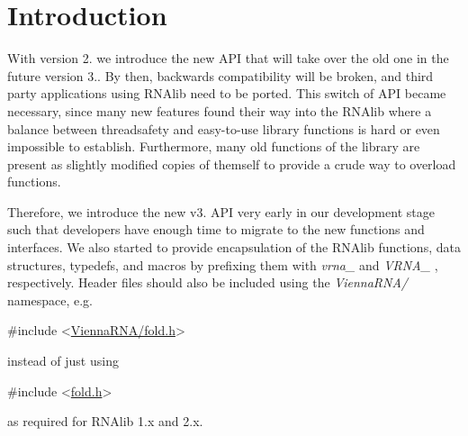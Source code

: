\hypertarget{newAPI_newAPI_intro}{}\section{Introduction}\label{newAPI_newAPI_intro}
With version 2. we introduce the new A\-P\-I that will take over the old one in the future version 3.. By then, backwards compatibility will be broken, and third party applications using R\-N\-Alib need to be ported. This switch of A\-P\-I became necessary, since many new features found their way into the R\-N\-Alib where a balance between threadsafety and easy-\/to-\/use library functions is hard or even impossible to establish. Furthermore, many old functions of the library are present as slightly modified copies of themself to provide a crude way to overload functions.

Therefore, we introduce the new v3. A\-P\-I very early in our development stage such that developers have enough time to migrate to the new functions and interfaces. We also started to provide encapsulation of the R\-N\-Alib functions, data structures, typedefs, and macros by prefixing them with {\itshape vrna\-\_\-} and {\itshape V\-R\-N\-A\-\_\-} , respectively. Header files should also be included using the {\itshape Vienna\-R\-N\-A/} namespace, e.\-g. 
\begin{DoxyCode}
\textcolor{preprocessor}{#include <\hyperlink{fold_8h}{ViennaRNA/fold.h}>}
\end{DoxyCode}
 instead of just using 
\begin{DoxyCode}
\textcolor{preprocessor}{#include <\hyperlink{fold_8h}{fold.h}>}
\end{DoxyCode}
 as required for R\-N\-Alib 1.\-x and 2.\-x.

